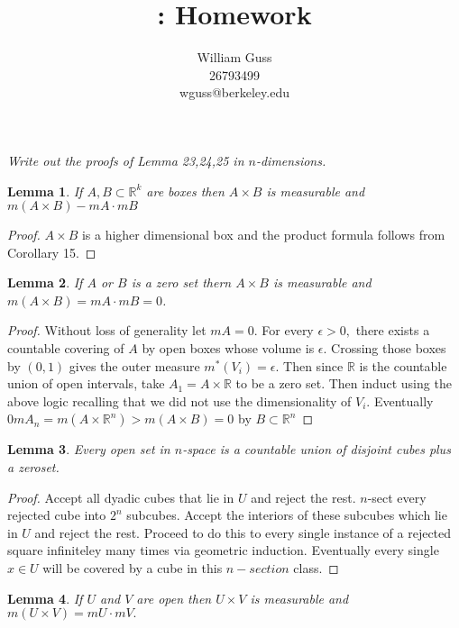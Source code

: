 \documentclass[letter]{article}
\title{\bCLASS: Homework \bHWN}
\author{William Guss\\26793499\\wguss@berkeley.edu}
\newtheorem{lemma}{Lemma}
\newenvironment{menumerate}{%
  \edef\backupindent{\the\parindent}%
  \enumerate%
  \setlength{\parindent}{\backupindent}%
}{\endenumerate}
\begin{document}
\maketitle
\thispagestyle{empty}
\begin{menumerate}
    \setcounter{enumi}{15}
    \item  \emph{Write out the proofs of Lemma 23,24,25 in $n$-dimensions.}
    \begin{lemma}
        If $A,B \subset \mathbb{R}^k$ are boxes then $A \times B$ is measurable and $m(A \times B) - mA \cdot mB$
    \end{lemma}
    \begin{proof}
        $A \times B$ is a higher dimensional box and the product formula follows from Corollary 15.
    \end{proof}
    \begin{lemma}
        If $A$ or $B$ is a zero set thern $A \times B$ is measurable and $m(A \times B) = mA \cdot mB = 0$. 
    \end{lemma}
    \begin{proof}
        Without loss of generality let $mA = 0$. For every $\epsilon > 0,$ there exists a countable covering of $A$ by open boxes whose volume is
        $\epsilon.$ Crossing those boxes by $(0,1)$ gives the outer measure $m^*(V_i) = \epsilon.$ Then since $\mathbb{R}$ is the countable union of 
        open intervals, take $A_1 = A \times \mathbb{R}$ to be a zero set. Then induct using the above logic recalling that we did not use the dimensionality
        of $V_i.$ Eventually $0 mA_n =m(A \times \mathbb{R}^n) > m(A \times B) = 0$ by $B \subset \mathbb{R}^n$
    \end{proof}
    \begin{lemma}
        Every open set in $n$-space is a countable union of disjoint cubes plus a zeroset. 
    \end{lemma}
    \begin{proof}
        Accept all dyadic cubes that lie in $U$ and reject the rest. $n$-sect every rejected cube into $2^n$ subcubes. Accept 
        the interiors of these subcubes which lie in $U$ and reject the rest. Proceed to do this to every single instance of a rejected square infiniteley
        many times via geometric induction. Eventually every single $x \in U$ will be covered by a cube in this $n-section$ class.
    \end{proof}
    \begin{lemma}
        If $U$ and $V$ are open then $U \times V$ is measurable and $m(U \times V) = mU\cdot mV.$   

\end{lemma}
\end{menumerate}
\end{document}
